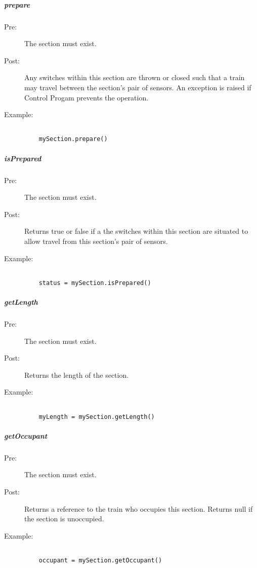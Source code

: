 \documentclass[a4paper,11pt,notitlepage]{article}
\def\CS{Control Progam\xspace}
\begin{document}
\subparagraph{prepare}
\begin{description}
\item[\hspace{1cm}Pre:] The section must exist.
\item[\hspace{1cm}Post:] Any switches within this section are thrown or closed such that a train may travel between the section's pair of sensors. An exception is raised if \CS prevents the operation.
\item[\hspace{1cm}Example:]
\begin{verbatim}

    mySection.prepare()
\end{verbatim}
\end{description}

\subparagraph{isPrepared}
\begin{description}
\item[\hspace{1cm}Pre:] The section must exist.
\item[\hspace{1cm}Post:] Returns true or false if a the switches within this section are situated to allow travel from this section's pair of sensors.
\item[\hspace{1cm}Example:]
\begin{verbatim}

    status = mySection.isPrepared()
\end{verbatim}
\end{description}

\subparagraph{getLength}
\begin{description}
\item[\hspace{1cm}Pre:] The section must exist.
\item[\hspace{1cm}Post:] Returns the length of the section.
\item[\hspace{1cm}Example:]
\begin{verbatim}

    myLength = mySection.getLength()
\end{verbatim}
\end{description}

\subparagraph{getOccupant}\begin{description}
\item[\hspace{1cm}Pre:] The section must exist.
\item[\hspace{1cm}Post:] Returns a reference to the train who occupies this section. Returns null if the section is unoccupied.
\item[\hspace{1cm}Example:]
\begin{verbatim}

    occupant = mySection.getOccupant()
\end{verbatim}
\end{description}
\end{document}
